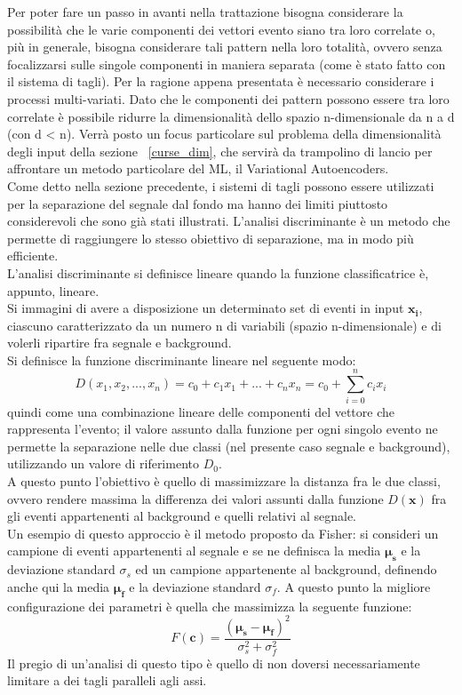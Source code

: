 Per poter fare un passo in avanti nella trattazione bisogna considerare la possibilità che le varie componenti dei vettori evento siano tra loro correlate o, più in generale, bisogna considerare tali pattern nella loro totalità, ovvero senza focalizzarsi sulle singole componenti in maniera separata (come è stato fatto con il sistema di tagli).  Per la ragione appena presentata è necessario considerare i processi multi-variati.	Dato che le componenti dei pattern possono essere tra loro correlate è possibile ridurre la dimensionalità dello spazio n-dimensionale da n a d (con d < n). Verrà posto un focus particolare sul problema della dimensionalità degli input della sezione ~\ref{curse_dim}, che servirà da trampolino di lancio per affrontare un metodo particolare del ML, il Variational Autoencoders. \\
Come detto nella sezione precedente, i sistemi di tagli possono essere utilizzati per la separazione del segnale dal fondo ma hanno dei limiti piuttosto considerevoli che sono già stati illustrati. L'analisi discriminante è un metodo che permette di raggiungere lo stesso obiettivo di separazione, ma in modo più efficiente. \\
L'analisi discriminante si definisce lineare quando la funzione classificatrice è, appunto, lineare. \\
Si immagini di avere a disposizione un determinato set di eventi in input $\textbf{x}_\textbf{i}$, ciascuno caratterizzato da un numero n di variabili (spazio n-dimensionale) e di volerli ripartire fra segnale e background.\\
Si definisce la funzione discriminante lineare nel seguente modo:
\begin{equation}
D(x_1 , x_2 , ... , x_n) = c_0 + c_1x_1 + ... +c_nx_n = c_0 + \sum_{i=0}^{n} c_ix_i 
\end{equation}
quindi come una combinazione lineare delle componenti del vettore che rappresenta l'evento; il valore assunto dalla funzione per ogni singolo evento ne permette la separazione nelle due classi (nel presente caso segnale e background), utilizzando un valore di riferimento $D_0$. \\
A questo punto l'obiettivo è quello di massimizzare la distanza fra le due classi, ovvero rendere massima la differenza dei valori assunti dalla funzione $D(\textbf{x})$ fra gli eventi appartenenti al background e quelli relativi al segnale. \\
Un esempio di questo approccio è il metodo proposto da Fisher: si consideri un campione di eventi appartenenti al segnale e se ne definisca la media $\bm\mu_\textbf{s}$ e la deviazione standard $\sigma_s$ ed un campione appartenente al background, definendo anche qui la media $\bm\mu_\textbf{f}$ e la deviazione standard $\sigma_f$. A questo punto la migliore configurazione dei parametri è quella che massimizza la seguente funzione: 
\begin{equation}
F(\textbf{c}) = \frac{(\bm\mu_\textbf{s} - \bm\mu_\textbf{f})^2}{\sigma_s^2 + \sigma_f^2}
\end{equation} 
Il pregio di un'analisi di questo tipo è quello di non doversi necessariamente limitare a dei tagli paralleli agli assi. 

